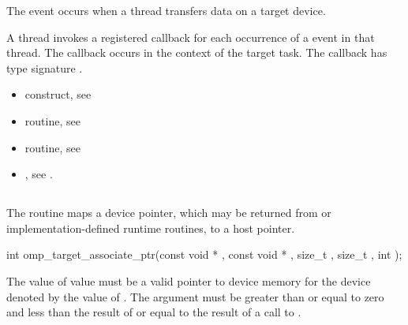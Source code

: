 \begin{ccppspecific}
\events
The  event occurs when a thread transfers data on a target device.

\tools

A thread invokes a registered 
callback for each occurrence of a  event in that thread. 
The callback occurs in the context of the target task.  The callback has type signature
. 


\crossreferences
\begin{itemize}
\item {} construct, see 

\item {} routine, see 

\item {} routine, see 


\item {}, see 
.

\end{itemize}

\subsection{}
\label{subsec:omp_target_associate_ptr}
\summary

The  routine maps a device pointer, which may
be returned from  or implementation-defined runtime 
routines, to a host pointer.

\format
\begin{boxedcode}
int omp\_target\_associate\_ptr(const void * ,
                                const void * ,
                                size\_t , size\_t ,
                                int );
\end{boxedcode}

\constraints

The value of  value must be a valid pointer to device 
memory for the device denoted by the value of .
The  argument
must be greater than or equal to zero and less than the result of
 or equal to the result of a call to
.


\end{ccppspecific}
